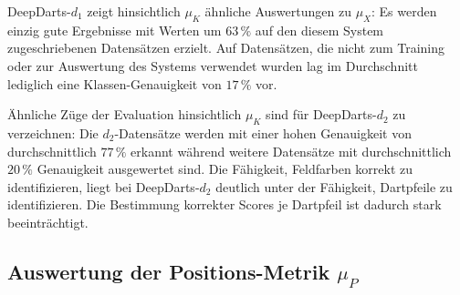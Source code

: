 DeepDarts-$d_1$ zeigt hinsichtlich $\mu_K$ ähnliche Auswertungen zu $\mu_X$: Es werden einzig gute Ergebnisse mit Werten um $63\,\%$ auf den diesem System zugeschriebenen Datensätzen erzielt. Auf Datensätzen, die nicht zum Training oder zur Auswertung des Systems verwendet wurden lag im Durchschnitt lediglich eine Klassen-Genauigkeit von $17\,\%$ vor.

Ähnliche Züge der Evaluation hinsichtlich $\mu_K$ sind für DeepDarts-$d_2$ zu verzeichnen: Die $d_2$-Datensätze werden mit einer hohen Genauigkeit von durchschnittlich $77\,\%$ erkannt während weitere Datensätze mit durchschnittlich $20\,\%$ Genauigkeit ausgewertet sind. Die Fähigkeit, Feldfarben korrekt zu identifizieren, liegt bei DeepDarts-$d_2$ deutlich unter der Fähigkeit, Dartpfeile zu identifizieren. Die Bestimmung korrekter Scores je Dartpfeil ist dadurch stark beeinträchtigt.


\subsection{Auswertung der Positions-Metrik \texorpdfstring{$\mu_P$}{µ\_P}}
\label{sec:auswertung_pos}

\NNPos

